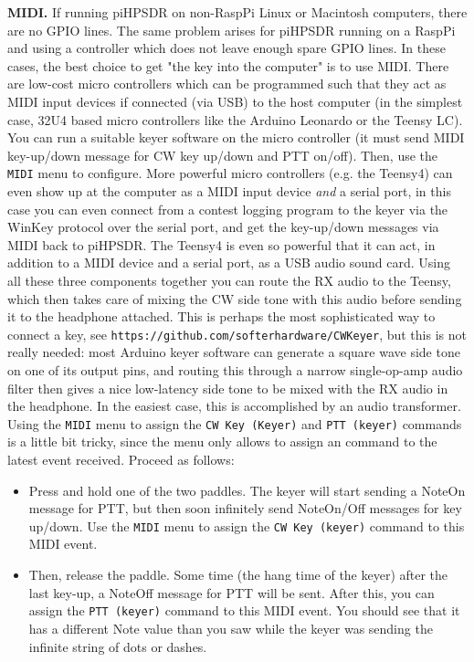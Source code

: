 \documentclass[12pt]{book}
\def\bltt#1{\texttt{\color{blue}#1}}
\def\pH{pi\-HPSDR\xspace}
\begin{document}
\textbf{MIDI.}
If running \pH on non-RaspPi Linux or Macintosh computers, there are no GPIO
lines. The same problem arises for \pH running on a RaspPi and using a controller
which does not leave enough spare GPIO lines. In these cases, the best
choice to get "the key into the computer" is to use MIDI. There are low-cost
micro controllers which can be programmed such that they act as MIDI input devices
if connected (via USB) to the host computer (in the simplest case, 32U4 based
micro controllers like the Arduino Leonardo or the Teensy LC). You can
run a suitable keyer software on the micro controller (it must send MIDI  key-up/down
message for CW key up/down and PTT on/off).  Then, use the
\bltt{MIDI} menu to configure. More powerful micro controllers (e.g. the Teensy4)
can even show up at the computer as a MIDI input device \textit{and} a serial port,
in this case you can even connect from a contest logging program to  the keyer
via the WinKey protocol over the serial port, and get the key-up/down messages
via MIDI back to \pH. The Teensy4 is even so powerful that it can act, in
addition to a MIDI device and a serial port, as a USB audio sound card.
Using all these three components together you can route the RX audio to the
Teensy, which then takes care of mixing the CW side tone with this audio
before sending it to the headphone attached. This is perhaps the most
sophisticated way to connect a key, see \texttt{https://github.com/softerhardware/CWKeyer},
but this is not really needed: most Arduino keyer software can generate a square wave
side tone on one of its output pins, and routing this through a narrow single-op-amp
audio filter then gives a nice low-latency side tone to be mixed with the RX audio
in the headphone. In the easiest case, this is accomplished by an audio transformer.
Using the \bltt{MIDI} menu to assign the \bltt{CW Key (Keyer)} and \bltt{PTT (keyer)}
commands is a little bit tricky, since the menu only allows to assign an command to
the latest event received. Proceed as follows:

\begin{itemize}
\item{Press and hold one of the two paddles. The keyer will start sending a NoteOn
message for PTT, but then soon infinitely send NoteOn/Off messages for key up/down.
Use the \bltt{MIDI} menu to assign the \bltt{CW Key (keyer)} command to this MIDI event.}
\item{Then, release the paddle. Some time (the hang time of the keyer) after the last
key-up, a NoteOff message for PTT will be sent. After this, you can assign the
\bltt{PTT (keyer)} command to this MIDI event. You should see that it has a different
Note value than you saw while the keyer was sending the infinite string of dots or
dashes.}
\end{itemize}
\end{document}
